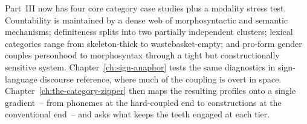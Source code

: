 Part~III now has four core category case studies plus a modality stress test. Countability is maintained by a dense web of morphosyntactic and semantic mechanisms; definiteness splits into two partially independent clusters; lexical categories range from skeleton-thick to wastebasket-empty; and pro-form gender couples personhood to morphosyntax through a tight but constructionally sensitive system. Chapter~\ref{ch:sign-anaphor} tests the same diagnostics in sign-language discourse reference, where much of the coupling is overt in space. Chapter~\ref{ch:the-category-zipper} then maps the resulting profiles onto a single gradient~-- from phonemes at the hard-coupled end to constructions at the conventional end~-- and asks what keeps the teeth engaged at each tier.
